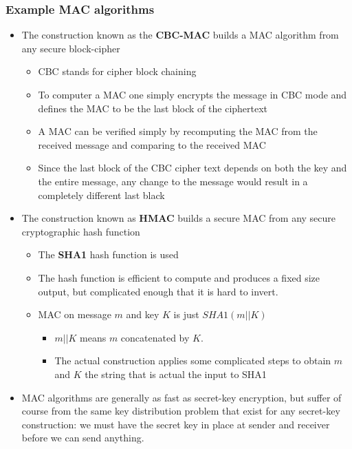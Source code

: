 \documentclass[11pt]{article}
\begin{document}
\subsubsection{Example MAC algorithms}
\label{sec:org3a27559}
\begin{itemize}
\item The construction known as the \textbf{CBC-MAC} builds a MAC algorithm from any secure block-cipher
\begin{itemize}
\item CBC stands for cipher block chaining
\item To computer a MAC one simply encrypts the message in CBC mode and defines the MAC to be the last block of the ciphertext
\item A MAC can be verified simply by recomputing the MAC from the received message and comparing to the received MAC
\item Since the last block of the CBC cipher text depends on both the key and the entire message, any change to the message would result in a completely different last black
\end{itemize}

\item The construction known as \textbf{HMAC} builds a secure MAC from any secure cryptographic hash function
\begin{itemize}
\item The \textbf{SHA1} hash function is used
\item The hash function is efficient to compute and produces a fixed size output, but complicated enough that it is hard to invert.
\item MAC on message \(m\) and key \(K\) is just \(SHA1(m||K)\)
\begin{itemize}
\item \(m||K\) means \(m\) concatenated by \(K\).
\item The actual construction applies some complicated steps to obtain \(m\) and \(K\) the string that is actual the input to SHA1
\end{itemize}
\end{itemize}

\item MAC algorithms are generally as fast as secret-key encryption, but suffer of course from the same key distribution problem that exist for any secret-key construction: we must have the secret key in place at sender and receiver before we can send anything.
\end{itemize}
\end{document}
